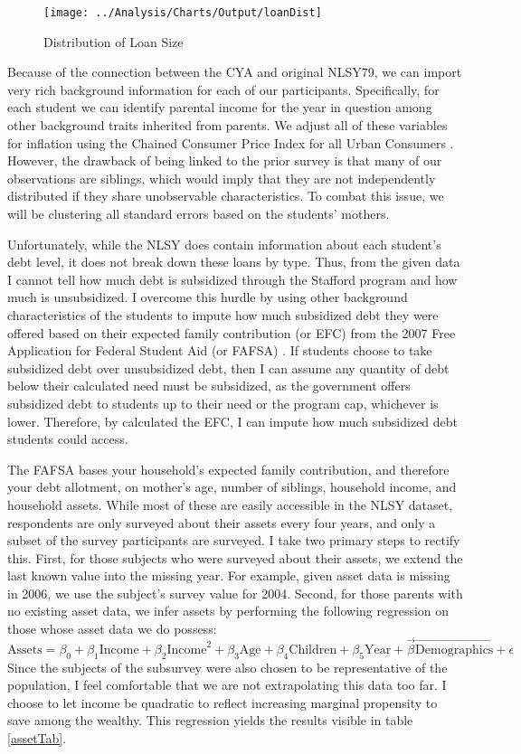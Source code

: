 \documentclass[12pt]{article}
\begin{document}
	\begin{figure}
		\centering
		\caption{Distribution of Loan Size}
		\label{loanDist}
		\texttt{[image: ../Analysis/Charts/Output/loanDist]}
	\end{figure}

	
	Because of the connection between the CYA and original NLSY79, we can import very rich background information for each of our participants. Specifically, for each student we can identify parental income for the year in question among other background traits inherited from parents. We adjust all of these variables for inflation using the Chained Consumer Price Index for all Urban Consumers \parencite{bls2019}. However, the drawback of being linked to the prior survey is that many of our observations are siblings, which would imply that they are not independently distributed if they share unobservable characteristics. To combat this issue, we will be clustering all standard errors based on the students' mothers. 
	
	Unfortunately, while the NLSY does contain information about each student's debt level, it does not break down these loans by type. Thus, from the given data I cannot tell how much debt is subsidized through the Stafford program and how much is unsubsidized. I overcome this hurdle by using other background characteristics of the students to impute how much subsidized debt they were offered based on their expected family contribution (or EFC) from the 2007 Free Application for Federal Student Aid (or FAFSA) \parencite{doe2007}. If students choose to take subsidized debt over unsubsidized debt, then I can assume any quantity of debt below their calculated need must be subsidized, as the government offers subsidized debt to students up to their need or the program cap, whichever is lower. Therefore, by calculated the EFC, I can impute how much subsidized debt students could access.
	
	The FAFSA bases your household's expected family contribution, and therefore your debt allotment, on mother's age, number of siblings, household income, and household assets. While most of these are easily accessible in the NLSY dataset, respondents are only surveyed about their assets every four years, and only a subset of the survey participants are surveyed. I take two primary steps to rectify this. First, for those subjects who were surveyed about their assets, we extend the last known value into the missing year. For example, given asset data is missing in 2006, we use the subject's survey value for 2004. Second, for those parents with no existing asset data, we infer assets by performing the following regression on those whose asset data we do possess: $$\mbox{Assets} = \beta_0 + \beta_1 \mbox{Income} + \beta_2 \mbox{Income}^2 + \beta_3 \mbox{Age} + \beta_4 \mbox{Children} + \beta_5 \mbox{Year} + \vec{\beta} \vec{\mbox{Demographics}} + \epsilon$$ Since the subjects of the subsurvey were also chosen to be representative of the population, I feel comfortable that we are not extrapolating this data too far. I choose to let income be quadratic to reflect increasing marginal propensity to save among the wealthy. This regression yields the results visible in table \ref{assetTab}.
	
\end{document}
